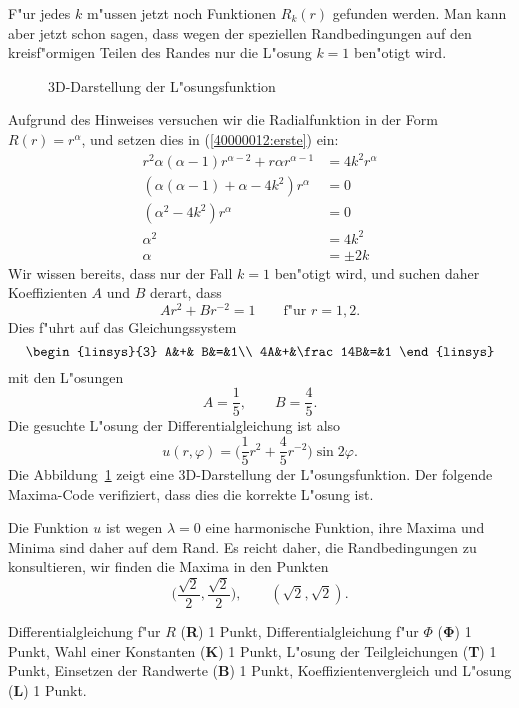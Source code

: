 \begin{loesung}
\begin{teilaufgaben}
F"ur jedes $k$ m"ussen jetzt noch Funktionen $R_k(r)$ gefunden werden.
Man kann aber jetzt schon sagen, dass wegen der speziellen Randbedingungen
auf den kreisf"ormigen Teilen des Randes nur die L"osung $k=1$ ben"otigt wird.

\begin{figure}
\centering
{}
\caption{3D-Darstellung der L"osungsfunktion
\label{40000012:3d}}
\end{figure}
Aufgrund des Hinweises versuchen wir die Radialfunktion in der Form
$R(r)=r^\alpha$, und setzen dies in (\ref{40000012:erste}) ein:
\begin{align*}
r^2\alpha(\alpha-1)r^{\alpha-2}+r\alpha r^{\alpha-1}&=4k^2r^{\alpha}
\\
(\alpha(\alpha-1)+\alpha -4k^2)r^{\alpha}&=0
\\
(\alpha^2 -4k^2)r^{\alpha}&=0
\\
\alpha^2&=4k^2
\\
\alpha&=\pm2k
\end{align*}
Wir wissen bereits, dass nur der Fall $k=1$ ben"otigt wird, und suchen
daher Koeffizienten $A$ und $B$ derart, dass
\[
Ar^2+Br^{-2}=1\qquad \text{f"ur $r=1,2$.}
\]
Dies f"uhrt auf das Gleichungssystem
\[
\begin{linsys}{3}
 A&+&       B&=&1\\
4A&+&\frac14B&=&1
\end{linsys}
\]
mit den L"osungen
\[
A=\frac15,\qquad B=\frac45.
\]
Die gesuchte L"osung der Differentialgleichung ist also
\[
u(r,\varphi)=\biggl(\frac15r^2+\frac45r^{-2}\biggr)\sin 2\varphi.
\]
Die Abbildung~\ref{40000012:3d} zeigt eine 3D-Darstellung der L"osungsfunktion.
Der folgende Maxima-Code verifiziert, dass dies die korrekte L"osung ist.
\item
Die Funktion $u$ ist wegen $\lambda=0$ eine harmonische Funktion, ihre
Maxima und Minima sind daher auf dem Rand.
Es reicht daher, die Randbedingungen zu konsultieren, wir finden die
Maxima in den Punkten
\[
\biggl(\frac{\sqrt{2}}{2},\frac{\sqrt{2}}2\biggr),\qquad
(\sqrt{2},\sqrt{2}).
\]
\end{teilaufgaben}
\end{loesung}

\begin{bewertung}
Differentialgleichung f"ur $R$ ({\bf R}) 1 Punkt,
Differentialgleichung f"ur $\Phi$ ({$\mathbf \Phi$}) 1 Punkt,
Wahl einer Konstanten ({\bf K}) 1 Punkt,
L"osung der Teilgleichungen ({\bf T}) 1 Punkt,
Einsetzen der Randwerte ({\bf B}) 1 Punkt,
Koeffizientenvergleich und L"osung ({\bf L}) 1 Punkt.
\end{bewertung}


